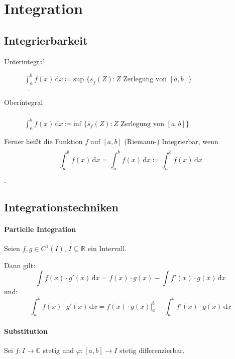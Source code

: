 \documentclass[a4paper, 11pt, accentcolor = tud3b]{tudreport}
\begin{document}
        \section{Integration}
            \subsection{Integrierbarkeit}
                \begin{description}
                    \item[Unterintegral] $ \underline{\int _ a ^ b} \! f(x) \, \mathrm{d}x \coloneqq \text{sup } \{ \underline{s} _ f (Z) : Z \text{ Zerlegung von } [a, b] \} $
                    \item[Oberintegral] $ \overline{\int _ a ^ b} \! f(x) \, \mathrm{d}x \coloneqq \text{inf } \{ \overline{s} _ f (Z) : Z \text{ Zerlegung von } [a, b] \} $
                \end{description}

                Ferner heißt die Funktion $ f $ auf $ [a, b] $ (Riemann-) Integrierbar, wenn \[ \underline{\int _ a ^ b} \! f(x) \, \mathrm{d}x = \overline{\int _ a ^ b} \! f(x) \, \mathrm{d}x \coloneqq \int _ a ^ b \! f(x) \, \mathrm{d}x \].

            \subsection{Integrationstechniken}
                \paragraph{Partielle Integration}
                    Seien $ f, g \in C ^ 1 (I) $, $ I \subseteq \mathbb{R} $ ein Intervall.

                    Dann gilt:
                    \begin{equation*}
                        \int \! f(x) \cdot g'(x) \, \mathrm{d}x = f(x) \cdot g(x) - \int \! f'(x) \cdot g(x) \, \mathrm{d}x
                    \end{equation*}
                    und:
                    \begin{equation*}
                        \int _ a ^ b \! f(x) \cdot g'(x) \, \mathrm{d}x = f(x) \cdot g(x) \Bigr| _ a ^ b - \int _ a ^ b \! f'(x) \cdot g(x) \, \mathrm{d}x
                    \end{equation*}

                \paragraph{Substitution}
                    Sei $ f : I \rightarrow \mathbb{C} $ stetig und $ \varphi : [a, b] \rightarrow I $ stetig differenzierbar.
\end{document}
